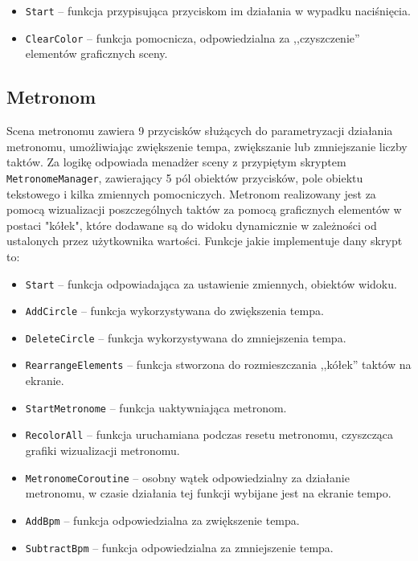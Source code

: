\begin{itemize}
    \item \texttt{Start} -- funkcja przypisująca przyciskom im działania w wypadku naciśnięcia.
    \item \texttt{ClearColor} -- funkcja pomocnicza, odpowiedzialna za ,,czyszczenie'' elementów graficznych sceny.
\end{itemize}

\subsection{Metronom}

Scena metronomu zawiera 9 przycisków służących do parametryzacji działania metronomu, umożliwiając zwiększenie tempa, zwiększanie lub zmniejszanie liczby taktów. Za logikę odpowiada menadżer sceny z przypiętym skryptem \texttt{MetronomeManager}, zawierający 5 pól obiektów przycisków, pole obiektu tekstowego i kilka zmiennych pomocniczych. Metronom realizowany jest za pomocą wizualizacji poszczególnych taktów za pomocą graficznych elementów w postaci "kółek", które dodawane są do widoku dynamicznie w zależności od ustalonych przez użytkownika wartości. Funkcje jakie implementuje dany skrypt to:

\begin{itemize}
    \item \texttt{Start} -- funkcja odpowiadająca za ustawienie zmiennych, obiektów widoku. 
    \item \texttt{AddCircle} -- funkcja wykorzystywana do zwiększenia tempa.
    \item \texttt{DeleteCircle} -- funkcja wykorzystywana do zmniejszenia tempa.
    \item \texttt{RearrangeElements} -- funkcja stworzona do rozmieszczania ,,kółek'' taktów na ekranie.
    \item \texttt{StartMetronome} -- funkcja uaktywniająca metronom.
    \item \texttt{RecolorAll} -- funkcja uruchamiana podczas resetu metronomu, czyszcząca grafiki wizualizacji metronomu.
    \item \texttt{MetronomeCoroutine} -- osobny wątek odpowiedzialny za działanie metronomu, w czasie działania tej funkcji wybijane jest na ekranie tempo.
    \item \texttt{AddBpm} -- funkcja odpowiedzialna za zwiększenie tempa.
    \item \texttt{SubtractBpm} -- funkcja odpowiedzialna za zmniejszenie tempa.
\end{itemize}

